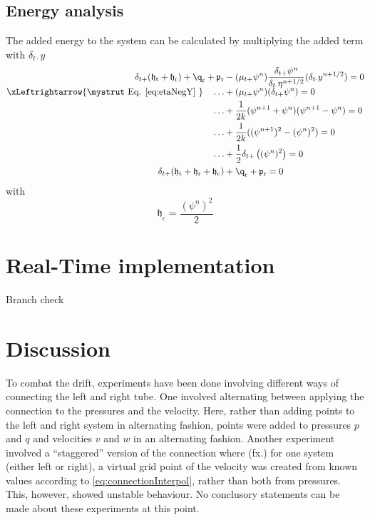 \subsection{Energy analysis}
The added energy to the system can be calculated by multiplying the added term with $\delta_{t\cdot}y$
\begin{align}
    \delta_{t+}(\mathfrak{h}_\text{t}+\mathfrak{h}_\text{r}) + \q_\text{r} + \mathfrak{p}_\text{r}&-(\mu_{t+}\psi^n) \frac{\delta_{t+}\psi^n}{\delta_{t\cdot}\eta^{n+1/2}}(\delta_{t\cdot}y^{n+1/2}) = 0\nonumber\\[-5pt]
    \xLeftrightarrow{\mystrut\ \text{Eq. \eqref{eq:etaNegY}}\ }\quad \hdots &+ (\mu_{t+}\psi^n) (\delta_{t+}\psi^n) = 0\nonumber\\
    \hdots &+ \frac{1}{2k}(\psi^{n+1}+\psi^n)(\psi^{n+1} - \psi^n)=0\nonumber\\
    \hdots  &+\frac{1}{2k}((\psi^{n+1})^2 - (\psi^n)^2)=0\nonumber\\
    \hdots &+ \frac{1}{2}\delta_{t+}\left((\psi^n)^2\right) = 0\nonumber\\
    \delta_{t+}(\mathfrak{h}_\text{t}+\mathfrak{h}_\text{r} + \mathfrak{h}_\text{c}) &+ \q_\text{r} + \mathfrak{p}_\text{r} = 0
\end{align}
with
\begin{equation}
    \mathfrak{h}_\text{c} = \frac{(\psi^n)^2}{2 }\nonumber
\end{equation}
\section{Real-Time implementation}
Branch check

\section{Discussion}
To combat the drift, experiments have been done involving different ways of connecting the left and right tube. One involved alternating between applying the connection to the pressures and the velocity. Here, rather than adding points to the left and right system in alternating fashion, points were added to pressures $p$ and $q$ and velocities $v$ and $w$ in an alternating fashion. Another experiment involved a ``staggered'' version of the connection where (fx.) for one system (either left or right), a virtual grid point of the velocity was created from known values according to \eqref{eq:connectionInterpol}, rather than both from pressures. This, however, showed unstable behaviour. No conclusory statements can be made about these experiments at this point. 



